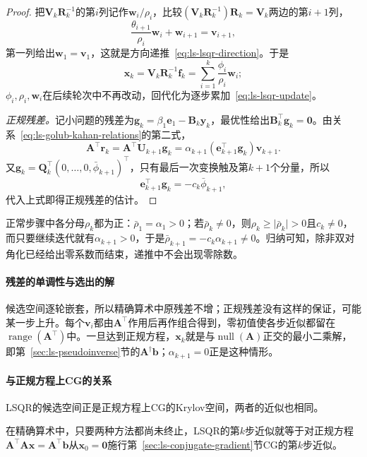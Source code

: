 \begin{proof}
把$\bm V_k\bm R_k^{-1}$的第$i$列记作$\bm w_i/\rho_i$，比较$(\bm V_k\bm R_k^{-1})\bm R_k=\bm V_k$两边的第$i+1$列，
\[
 \frac{\theta_{i+1}}{\rho_i}\bm w_i+\bm w_{i+1}=\bm v_{i+1},
\]
第一列给出$\bm w_1=\bm v_1$，这就是方向递推~\eqref{eq:ls-lsqr-direction}。于是
\[
 \bm x_k=\bm V_k\bm R_k^{-1}\bm f_k=\sum_{i=1}^k\frac{\phi_i}{\rho_i}\bm w_i ;
\]
$\phi_i,\rho_i,\bm w_i$在后续轮次中不再改动，回代化为逐步累加~\eqref{eq:ls-lsqr-update}。

\emph{正规残差。}记小问题的残差为$\bm g_k=\beta_1\bm e_1-\bm B_k\bm y_k$，最优性给出$\bm B_k^\top\bm g_k=\bm0$。由关系~\eqref{eq:ls-golub-kahan-relations}的第二式，
\[
 \bm A^\top\bm r_k=\bm A^\top\bm U_{k+1}\bm g_k=\alpha_{k+1}(\bm e_{k+1}^\top\bm g_k)\bm v_{k+1}.
\]
又$\bm g_k=\bm Q_k^\top(0,\ldots,0,\bar\phi_{k+1})^\top$，只有最后一次变换触及第$k+1$个分量，所以
\[
 \bm e_{k+1}^\top\bm g_k=-c_k\bar\phi_{k+1} ,
\]
代入上式即得正规残差的估计。
\end{proof}

正常步骤中各分母$\rho_k$都为正：$\bar\rho_1=\alpha_1>0$；若$\bar\rho_k\neq0$，则$\rho_k\ge\lvert\bar\rho_k\rvert>0$且$c_k\neq0$，而只要继续迭代就有$\alpha_{k+1}>0$，于是$\bar\rho_{k+1}=-c_k\alpha_{k+1}\neq0$。归纳可知，除非双对角化已经给出零系数而结束，递推中不会出现零除数。

\paragraph{残差的单调性与选出的解}
候选空间逐轮嵌套，所以精确算术中原残差不增；正规残差没有这样的保证，可能某一步上升。每个$\bm v_i$都由$\bm A^\top$作用后再作组合得到，零初值使各步近似都留在$\operatorname{range}(\bm A^\top)$中。一旦达到正规方程，$\bm x_k$就是与$\operatorname{null}(\bm A)$正交的最小二乘解，即第~\ref{sec:ls-pseudoinverse}节的$\bm A^\dagger\bm b$；$\alpha_{k+1}=0$正是这种情形。

\paragraph{与正规方程上CG的关系}
LSQR的候选空间正是正规方程上CG的Krylov空间，两者的近似也相同。

\begin{theorem}[LSQR与正规方程上的CG]
\label{thm:ls-lsqr-cg-equivalence}
在精确算术中，只要两种方法都尚未终止，LSQR的第$k$步近似就等于对正规方程$\bm A^\top\bm A\bm x=\bm A^\top\bm b$从$\bm x_0=\bm0$施行第~\ref{sec:ls-conjugate-gradient}节CG的第$k$步近似。
\end{theorem}

